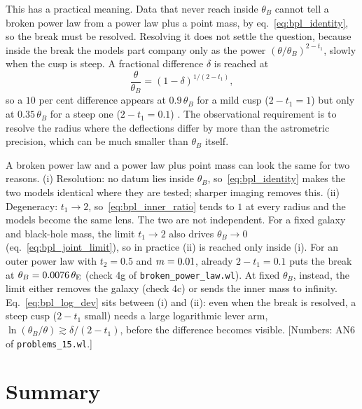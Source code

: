 This has a practical meaning.  Data that never reach inside $\theta_B$
cannot tell a broken power law from a power law plus a point mass, by
eq.~\eqref{eq:bpl_identity}, so the break must be resolved.  Resolving
it does not settle the question, because inside the break the models
part company only as the power $(\theta/\theta_B)^{2-t_1}$, slowly when
the cusp is steep.  A fractional difference $\delta$ is reached at
\begin{equation}
    \frac{\theta}{\theta_B}=(1-\delta)^{1/(2-t_1)} ,
    \label{eq:bpl_delta_radius}
\end{equation}
so a $10$ per cent difference appears at $0.9\,\theta_B$ for a mild
cusp ($2-t_1=1$) but only at $0.35\,\theta_B$ for a steep one
($2-t_1=0.1$) .  The observational requirement is to
resolve the radius where the deflections differ by more than the
astrometric precision, which can be much smaller than $\theta_B$
itself.

\begin{annotation}
A broken power law and a power law plus point mass can look the same
for two reasons.  (i) Resolution: no datum lies
inside $\theta_B$, so~\eqref{eq:bpl_identity} makes the two models
identical where they are tested; sharper imaging removes this.
(ii) Degeneracy: $t_1\to2$, so~\eqref{eq:bpl_inner_ratio} tends
to $1$ at every radius and the models become the same lens.  The two
are not independent.  For a fixed galaxy and black-hole mass, the limit
$t_1\to2$ also drives $\theta_B\to0$ (eq.~\ref{eq:bpl_joint_limit}),
so in practice (ii) is reached only inside (i).  For an outer power law
with $t_2=0.5$ and $m=0.01$, already $2-t_1=0.1$ puts the break at
$\theta_B=0.0076\,\theta_{\mathrm{E}}$ (check 4g of \texttt{broken\_power\_law.wl}).
At fixed $\theta_B$, instead, the limit either removes the galaxy
(check 4c) or sends the inner mass to infinity.  Eq.~\eqref{eq:bpl_log_dev} sits between (i) and (ii): even
when the break is resolved, a steep cusp ($2-t_1$ small) needs a large
logarithmic lever arm, $\ln(\theta_B/\theta)\gtrsim\delta/(2-t_1)$,
before the difference becomes visible.  [Numbers: AN6 of
\texttt{problems\_15.wl}.]
\end{annotation}


\section{Summary}
\label{sec:pl_summary}

